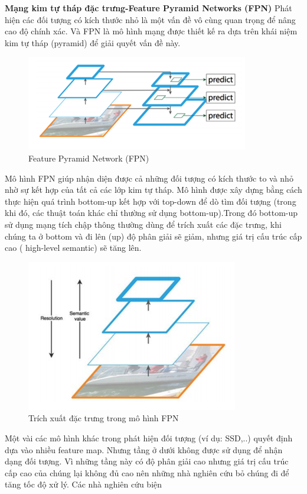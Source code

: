 \documentclass[a4paper, 12pt]{report}
\begin{document}
\textbf{Mạng kim tự tháp đặc trưng-Feature Pyramid Networks (FPN)} 
Phát hiện các đối tượng có kích thước nhỏ là một vấn đề vô cùng quan
trọng để nâng cao độ chính xác. Và FPN là mô hình mạng được thiết kế
ra dựa trên khái niệm kim tự tháp (pyramid) để giải quyết vấn đề này. \\
\begin{figure}[!h]
	\centering
	\includegraphics[width=0.5\linewidth]{Images/fpn1}
	\caption{Feature Pyramid Network (FPN)}
	\label{fig:resnet-fpn1}
\end{figure}
\hspace*{1cm}Mô hình FPN giúp nhận diện được cả những đối tượng có kích thước
to và nhỏ nhờ sự kết hợp của tất cả các lớp kim tự tháp. Mô hình được
xây dựng bằng cách thực hiện quá trình bottom-up kết hợp với top-down
để dò tìm đối tượng (trong khi đó, các thuật toán khác chỉ thường sử dụng
bottom-up).Trong đó bottom-up sử dụng mạng tích chập thông thường
dùng để trích xuất các đặc trưng, khi chúng ta ở bottom và đi lên (up) độ
phân giải sẽ giảm, nhưng giá trị cấu trúc cấp cao ( high-level semantic) sẽ
tăng lên. \\
\begin{figure}[!h]
	\centering
	\includegraphics[width=0.5\linewidth]{Images/fpn2}
	\caption{Trích xuất đặc trưng trong mô hình FPN}
	\label{fig:resnet-fpn2}
\end{figure}
\hspace*{1cm}Một vài các mô hình khác trong phát hiện đối tượng (ví dụ: SSD,..)
quyết định dựa vào nhiều feature map. Nhưng tầng ở dưới không được
sử dụng để nhận dạng đối tượng. Vì những tầng này có độ phân giải cao
nhưng giá trị cấu trúc cấp cao của chúng lại không đủ cao nên những nhà
nghiên cứu bỏ chúng đi để tăng tốc độ xử lý. Các nhà nghiên cứu biện
\end{document}
